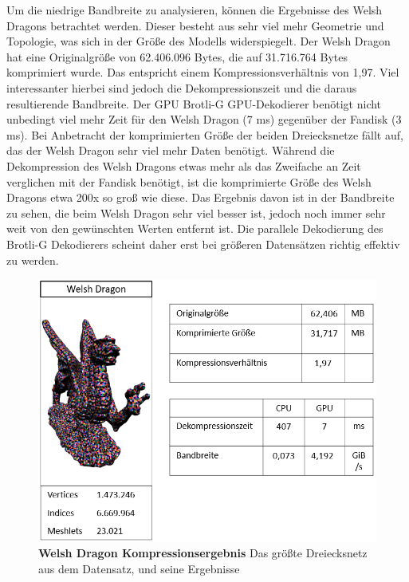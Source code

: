 Um die niedrige Bandbreite zu analysieren, können die Ergebnisse des Welsh Dragons betrachtet werden. 
Dieser besteht aus sehr viel mehr Geometrie und Topologie, was sich in der Größe des Modells widerspiegelt. 
Der Welsh Dragon hat eine Originalgröße von 62.406.096 Bytes, die auf 31.716.764 Bytes komprimiert wurde. 
Das entspricht einem Kompressionsverhältnis von 1,97.
Viel interessanter hierbei sind jedoch die Dekompressionszeit und die daraus resultierende Bandbreite. 
Der GPU Brotli-G GPU-Dekodierer benötigt nicht unbedingt viel mehr Zeit für den Welsh Dragon (7 ms) gegenüber der Fandisk (3 ms).
Bei Anbetracht der komprimierten Größe der beiden Dreiecksnetze fällt auf, das der Welsh Dragon sehr viel mehr Daten benötigt. 
Während die Dekompression des Welsh Dragons etwas mehr als das Zweifache an Zeit verglichen mit der Fandisk benötigt, ist die komprimierte Größe des Welsh Dragons etwa 200x so groß wie diese.
Das Ergebnis davon ist in der Bandbreite zu sehen, die beim Welsh Dragon sehr viel besser ist, jedoch noch immer sehr weit von den gewünschten Werten entfernt ist.
Die parallele Dekodierung des Brotli-G Dekodierers scheint daher erst bei größeren Datensätzen richtig effektiv zu werden.

\begin{figure}[htb]
  \centering  
  \includegraphics[scale=0.75]{Bilder/ergebnisse/welshdragon.png}
  \caption[Welsh Dragon Kompressionsergebnis]{\textbf{Welsh Dragon Kompressionsergebnis} Das größte Dreiecksnetz aus dem Datensatz, und seine Ergebnisse}
  \label{fig:mesh_shading_pipeline}
\end{figure}

